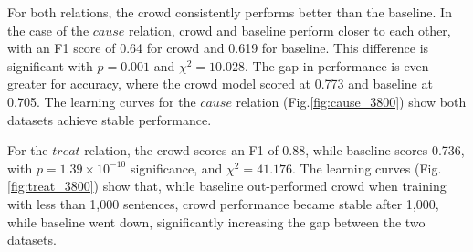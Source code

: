 \begin{table}[!htb]
\centering
\caption{Model evaluation results over 3,984 sentences. Crowd scores are shown at 0.5 sentence-relation score threshold.}
\label{tab:statistic_bas}
\end{table}

For both relations, the crowd consistently performs better than the baseline. In the case of the $cause$ relation, crowd and baseline perform closer to each other, with an F1 score of 0.64 for crowd and 0.619 for baseline. This difference is significant with $ p = 0.001 $ and $\chi^2 = 10.028$. The gap in performance is even greater for accuracy, where the  crowd model scored at 0.773 and baseline at 0.705. The learning curves for the $cause$ relation (Fig.\ref{fig:cause_3800}) show both datasets achieve stable performance.

For the $treat$ relation, the crowd scores an F1 of 0.88, while baseline scores 0.736, with $p = 1.39 \times 10^{-10} $ significance, and $\chi^2 = 41.176$. The learning curves (Fig.\ref{fig:treat_3800}) show that, while baseline out-performed crowd when training with less than 1,000 sentences, crowd performance became stable after 1,000, while baseline went down, significantly increasing the gap between the two datasets.

